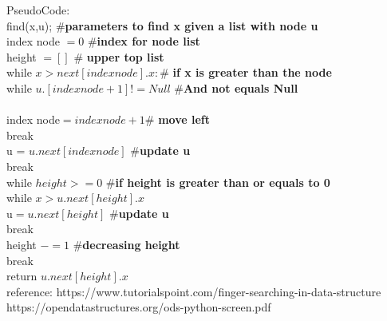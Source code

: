 \documentclass[addpoints]{exam}
\begin{document}
\begin{questions}
\begin{solution}
PseudoCode:\\
  \indent \hspace{3em}find(x,u); {\#}\textbf{parameters to find x given a list with node u}\\
  \indent \hspace{3em}index node $=0$ {\#}\textbf{index for node list}\\ 
  \indent \hspace{3em}height $= []$ {\#} \textbf{upper top list}\\
 \indent \hspace{3em} while $x > next[index node].x:${\#} \textbf{if x is greater than the node} \\
   \indent \hspace{6em} while $u.[index node + 1] != Null$ {\#}\textbf{And not equals Null}\\
    \\
    \indent \hspace{9em}index node$ = index node + 1${\#} \textbf{move left}\\
    \indent \hspace{6em}break\\
    \indent \hspace{6em}u = $u.next[index node]$ {\#}\textbf{update u}\\
    \indent \hspace{3em}break\\
    \indent \hspace{3em}while  $height >= 0$ {\#}\textbf{if height is greater than or equals to 0}\\
   \indent \hspace{6em} while $x > u.next[height].x$\\
   \indent \hspace{9em} u$ = u.next[height]$ {\#}\textbf{update u}\\
    \indent \hspace{6em}break\\
    \indent \hspace{6em}height $-= 1$ {\#}\textbf{decreasing height}\\
    \indent \hspace{3em}break\\
    \indent \hspace{3em}return $u.next[height].x$\\
  
  reference: https://www.tutorialspoint.com/finger-searching-in-data-structure\\
  https://opendatastructures.org/ods-python-screen.pdf
  

\end{solution}
\end{questions}
\end{document}
